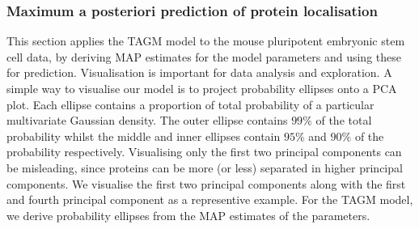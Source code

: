 \documentclass[12pt,english]{article}
\begin{document}
\subsubsection{Maximum a posteriori prediction of protein localisation}
This section applies the TAGM model to the mouse pluripotent embryonic
stem cell data, by deriving MAP estimates for the model parameters and
using these for prediction.  Visualisation is important for data
analysis and exploration. A simple way to visualise our model is to
project probability ellipses onto a PCA plot. Each ellipse contains
a proportion of total probability of a particular multivariate
Gaussian density.  The outer ellipse contains $99\%$ of the total
probability whilst the middle and inner ellipses contain $95\%$ and
$90\%$ of the probability respectively. Visualising only the first two
principal components can be misleading, since proteins can be more (or
less) separated in higher principal components.  We visualise the
first two principal components along with the first and fourth
principal component as a representive example. For the TAGM model, we
derive probability ellipses from the MAP estimates of the parameters.
\end{document}
